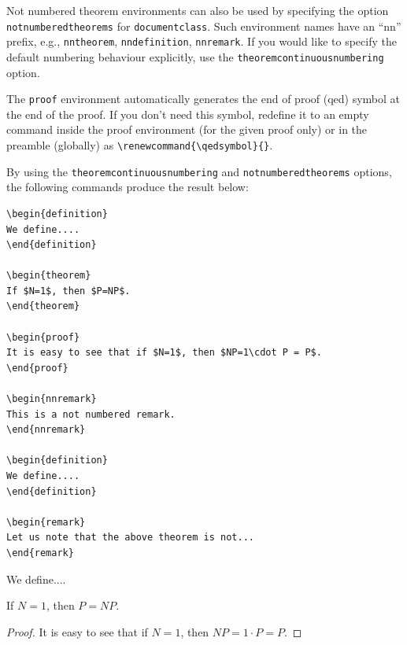 \documentclass[notnumberedtheorems,withtitlethanks]{actacyb}
\begin{document}
Not numbered theorem environments can also be used by specifying the option \verb|notnumberedtheorems| for \verb|documentclass|. Such environment names have an ``nn'' prefix, e.g., \verb|nntheorem|, \verb|nndefinition|, \verb|nnremark|.
If you would like to specify the default numbering behaviour explicitly, use the
\verb|theoremcontinuousnumbering| option.

The \verb|proof| environment automatically generates the end of proof (qed) symbol
at the end of the proof. If you don't need this symbol, redefine it to an empty command
inside the proof environment (for the given proof only) or in the preamble (globally) as \verb|\renewcommand{\qedsymbol}{}|.

By using the \verb|theoremcontinuousnumbering| and \verb|notnumberedtheorems| options, the following commands produce the result below:

\begin{verbatim}
\begin{definition}
We define....
\end{definition}

\begin{theorem}
If $N=1$, then $P=NP$.
\end{theorem}

\begin{proof}
It is easy to see that if $N=1$, then $NP=1\cdot P = P$.
\end{proof}

\begin{nnremark}
This is a not numbered remark.
\end{nnremark}

\begin{definition}
We define....
\end{definition}

\begin{remark}
Let us note that the above theorem is not...
\end{remark}
\end{verbatim}


\begin{definition}
We define....
\end{definition}

\begin{theorem}
If $N=1$, then $P=NP$.
\end{theorem}

\begin{proof}
It is easy to see that if $N=1$, then $NP=1\cdot P = P$.
\end{proof}
\end{document}
